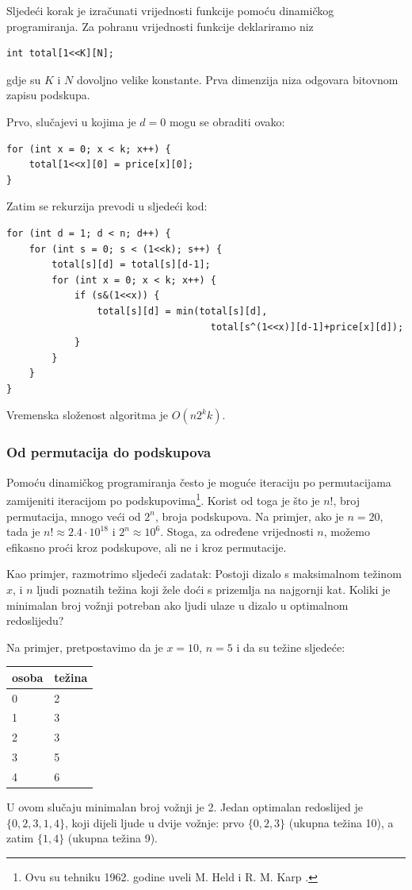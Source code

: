 Sljedeći korak je izračunati vrijednosti funkcije
pomoću dinamičkog programiranja.
Za pohranu vrijednosti funkcije deklariramo niz
\begin{lstlisting}
int total[1<<K][N];
\end{lstlisting}
gdje su $K$ i $N$ dovoljno velike konstante.
Prva dimenzija niza odgovara bitovnom
zapisu podskupa.

Prvo, slučajevi u kojima je $d=0$ mogu se obraditi ovako:
\begin{lstlisting}
for (int x = 0; x < k; x++) {
    total[1<<x][0] = price[x][0];
}
\end{lstlisting}
Zatim se rekurzija prevodi u sljedeći kod:
\begin{lstlisting}
for (int d = 1; d < n; d++) {
    for (int s = 0; s < (1<<k); s++) {
        total[s][d] = total[s][d-1];
        for (int x = 0; x < k; x++) {
            if (s&(1<<x)) {
                total[s][d] = min(total[s][d],
                                    total[s^(1<<x)][d-1]+price[x][d]);
            }
        }
    }
}
\end{lstlisting}
Vremenska složenost algoritma je $O(n 2^k k)$.

\subsubsection{Od permutacija do podskupova}

Pomoću dinamičkog programiranja često je moguće
iteraciju po permutacijama zamijeniti
iteracijom po podskupovima\footnote{Ovu su tehniku 1962. godine uveli
M. Held i R. M. Karp \cite{hel62}.}.
Korist od toga je što je
$n!$, broj permutacija,
mnogo veći od $2^n$, broja podskupova.
Na primjer, ako je $n=20$, tada je
$n! \approx 2.4 \cdot 10^{18}$ i $2^n \approx 10^6$.
Stoga, za određene vrijednosti $n$,
možemo efikasno proći kroz podskupove, ali ne i kroz permutacije.

Kao primjer, razmotrimo sljedeći zadatak:
Postoji dizalo s maksimalnom težinom $x$,
i $n$ ljudi poznatih težina
koji žele doći s prizemlja
na najgornji kat.
Koliki je minimalan broj vožnji potreban
ako ljudi ulaze u dizalo u optimalnom redoslijedu?

Na primjer, pretpostavimo da je $x=10$, $n=5$
i da su težine sljedeće:
\begin{center}
\begin{tabular}{ll}
osoba & težina \\
\hline
0 & 2 \\
1 & 3 \\
2 & 3 \\
3 & 5 \\
4 & 6 \\
\end{tabular}
\end{center}
U ovom slučaju minimalan broj vožnji je 2.
Jedan optimalan redoslijed je $\{0,2,3,1,4\}$,
koji dijeli ljude u dvije vožnje:
prvo $\{0,2,3\}$ (ukupna težina 10),
a zatim $\{1,4\}$ (ukupna težina 9).

